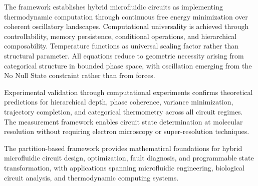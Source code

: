 \documentclass[12pt,a4paper]{article}
\theoremstyle{plain}
\theoremstyle{definition}
\theoremstyle{remark}
\begin{document}
The framework establishes hybrid microfluidic circuits as implementing thermodynamic computation through continuous free energy minimization over coherent oscillatory landscapes. Computational universality is achieved through controllability, memory persistence, conditional operations, and hierarchical composability. Temperature functions as universal scaling factor rather than structural parameter. All equations reduce to geometric necessity arising from categorical structure in bounded phase space, with oscillation emerging from the No Null State constraint rather than from forces.

Experimental validation through computational experiments confirms theoretical predictions for hierarchical depth, phase coherence, variance minimization, trajectory completion, and categorical thermometry across all circuit regimes. The measurement framework enables circuit state determination at molecular resolution without requiring electron microscopy or super-resolution techniques.

The partition-based framework provides mathematical foundations for hybrid microfluidic circuit design, optimization, fault diagnosis, and programmable state transformation, with applications spanning microfluidic engineering, biological circuit analysis, and thermodynamic computing systems.



\end{document}

